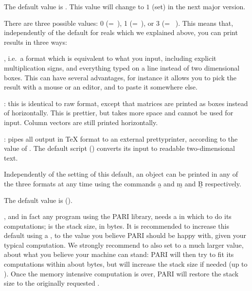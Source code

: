 {The default value is . This value will change to $1$ (set) in the next
major version.

\label{se:def,output}
There are three possible values: 0
(=~), 1 (=~), or 3
(=~ ). This
means that, independently of the default  for reals which we
explained above, you can print results in three ways:

\item {}, i.e.~a format which is equivalent to what you
input, including explicit multiplication signs, and everything typed on a
line instead of two dimensional boxes. This can have several advantages, for
instance it allows you to pick the result with a mouse or an editor, and to
paste it somewhere else.

\item {}: this is identical to raw format, except
that matrices are printed as boxes instead of horizontally. This is
prettier, but takes more space and cannot be used for input. Column vectors
are still printed horizontally.

\item {}: pipes all 
output in TeX format to an external prettyprinter, according to the value of
. The default script () converts its input
to readable two-dimensional text.

Independently of the setting of this default, an object can be printed
in any of the three formats at any time using the commands \b{a} and \b{m}
and \b{B} respectively.

The default value is  ().

\label{se:def,parisize}
, and in fact any program using the PARI
library, needs a  in which to do its computations; 
is the stack size, in bytes. It is recommended to increase this
default using a , to the value you believe PARI should be happy
with, given your typical computation. We strongly recommend to also
set  to a much larger value, about what you believe your
machine can stand: PARI will then try to fit its computations within about
 bytes, but will increase the stack size if needed (up to
). Once the memory intensive computation is over, PARI
will restore the stack size to the originally requested .

}
